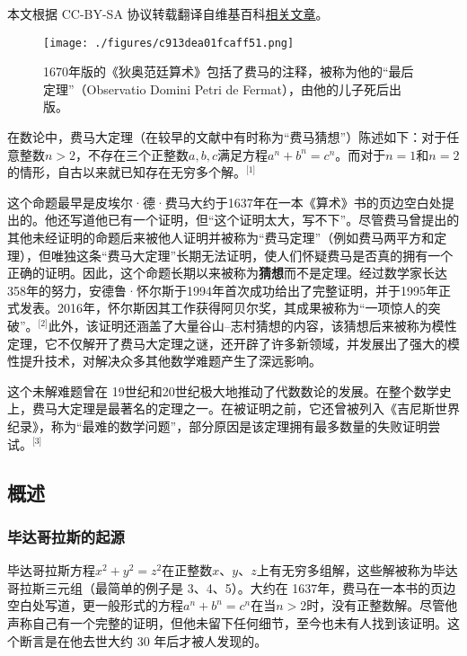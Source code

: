 
本文根据 CC-BY-SA 协议转载翻译自维基百科\href{https://en.wikipedia.org/wiki/Fermat\%27s_Last_Theorem}{相关文章}。

\begin{figure}[ht]
\centering
\texttt{[image: ./figures/c913dea01fcaff51.png]}
\caption{1670年版的《狄奥范廷算术》包括了费马的注释，被称为他的“最后定理”（Observatio Domini Petri de Fermat），由他的儿子死后出版。} \label{fig_FMDL_4}
\end{figure}
在数论中，费马大定理（在较早的文献中有时称为“费马猜想”）陈述如下：对于任意整数\( n > 2 \)，不存在三个正整数\( a, b, c \)满足方程\( a^n + b^n = c^n \)。而对于\( n = 1 \)和\( n = 2 \)的情形，自古以来就已知存在无穷多个解。\(^\text{[1]}\)

这个命题最早是皮埃尔·德·费马大约于1637年在一本《算术》书的页边空白处提出的。他还写道他已有一个证明，但“这个证明太大，写不下”。尽管费马曾提出的其他未经证明的命题后来被他人证明并被称为“费马定理”（例如费马两平方和定理），但唯独这条“费马大定理”长期无法证明，使人们怀疑费马是否真的拥有一个正确的证明。因此，这个命题长期以来被称为\textbf{猜想}而不是定理。经过数学家长达358年的努力，安德鲁·怀尔斯于1994年首次成功给出了完整证明，并于1995年正式发表。2016年，怀尔斯因其工作获得阿贝尔奖，其成果被称为“一项惊人的突破”。\(^\text{[2]}\)此外，该证明还涵盖了大量谷山–志村猜想的内容，该猜想后来被称为模性定理，它不仅解开了费马大定理之谜，还开辟了许多新领域，并发展出了强大的模性提升技术，对解决众多其他数学难题产生了深远影响。

这个未解难题曾在 19世纪和20世纪极大地推动了代数数论的发展。在整个数学史上，费马大定理是最著名的定理之一。在被证明之前，它还曾被列入《吉尼斯世界纪录》，称为“最难的数学问题”，部分原因是该定理拥有最多数量的失败证明尝试。\(^\text{[3]}\)
\subsection{概述}  
\subsubsection{毕达哥拉斯的起源}
毕达哥拉斯方程\(x^2 + y^2 = z^2\)在正整数\(x\)、\(y\)、\(z\)上有无穷多组解，这些解被称为毕达哥拉斯三元组（最简单的例子是 3、4、5）。大约在 1637年，费马在一本书的页边空白处写道，更一般形式的方程\(a^n + b^n = c^n\)在当\(n > 2\)时，没有正整数解。尽管他声称自己有一个完整的证明，但他未留下任何细节，至今也未有人找到该证明。这个断言是在他去世大约 30 年后才被人发现的。


